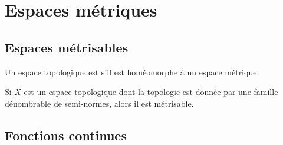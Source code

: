 
\section{Espaces métriques}

\subsection{Espaces métrisables}

\begin{definition}
    Un espace topologique est  s'il est homéomorphe à un espace métrique.
\end{definition}

\begin{proposition}     \label{PROPooMJEQooHtIyeX}
    Si \( X\) est un espace topologique dont la topologie est donnée par une famille dénombrable de semi-normes, alors il est métrisable.
\end{proposition}

\subsection{Fonctions continues}


